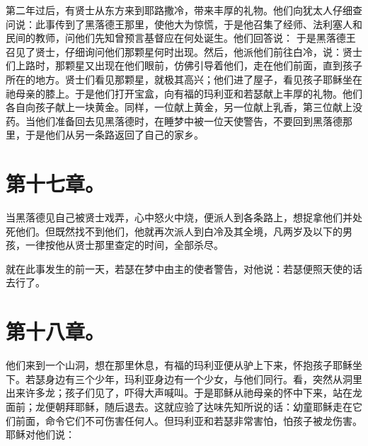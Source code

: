 第二年过后，有贤士从东方来到耶路撒冷，带来丰厚的礼物。他们向犹太人仔细查问说：此事传到了黑落德王那里，使他大为惊慌，于是他召集了经师、法利塞人和民间的教师，问他们先知曾预言基督应在何处诞生。他们回答说： 于是黑落德王召见了贤士，仔细询问他们那颗星何时出现。然后，他派他们前往白冷，说：贤士们上路时，那颗星又出现在他们眼前，仿佛引导着他们，走在他们前面，直到孩子所在的地方。贤士们看见那颗星，就极其高兴；他们进了屋子，看见孩子耶稣坐在祂母亲的膝上。于是他们打开宝盒，向有福的玛利亚和若瑟献上丰厚的礼物。他们各自向孩子献上一块黄金。同样，一位献上黄金，另一位献上乳香，第三位献上没药。当他们准备回去见黑落德时，在睡梦中被一位天使警告，不要回到黑落德那里，于是他们从另一条路返回了自己的家乡。\par


\section{第十七章。}

当黑落德见自己被贤士戏弄，心中怒火中烧，便派人到各条路上，想捉拿他们并处死他们。但既然找不到他们，他就再次派人到白冷及其全境，凡两岁及以下的男孩，一律按他从贤士那里查定的时间，全部杀尽。\par

就在此事发生的前一天，若瑟在梦中由主的使者警告，对他说：若瑟便照天使的话去行了。\par


\section{第十八章。}

他们来到一个山洞，想在那里休息，有福的玛利亚便从驴上下来，怀抱孩子耶稣坐下。若瑟身边有三个少年，玛利亚身边有一个少女，与他们同行。看，突然从洞里出来许多龙；孩子们见了，吓得大声喊叫。于是耶稣从祂母亲的怀中下来，站在龙面前；龙便朝拜耶稣，随后退去。这就应验了达味先知所说的话：幼童耶稣走在它们前面，命令它们不可伤害任何人。但玛利亚和若瑟非常害怕，怕孩子被龙伤害。耶稣对他们说：\par

